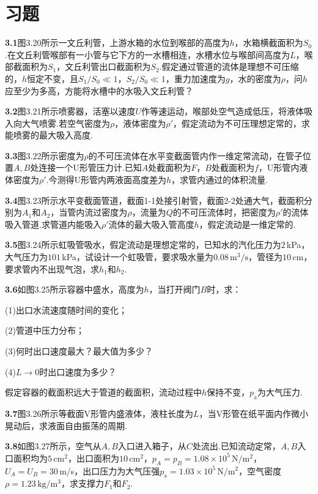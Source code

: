 \section*{习题}

\noindent\textbf{3.1}\quad 图3.20所示一文丘利管，上游水箱的水位到喉部的高度为$h$，水箱横截面积为$S_0$.在文丘利管喉部有一小管与它下方的一水槽相连，水槽水位与喉部间高度为$L$，喉部截面积为$S_1$，文丘利管出口截面积为$S_2$.假定通过管道的流体是理想不可压缩的，$h$恒定不变，且$S_1/S_0\ll 1$，$S_2/S_0\ll 1$，重力加速度为$g$，水的密度为$\rho$，问$h$应至少为多高，方能将水槽中的水吸入文丘利管？

\medskip
\noindent\textbf{3.2}\quad 图3.21所示喷雾器，活塞以速度$U$作等速运动，喉部处空气造成低压，将液体吸入向大气喷雾.若空气密度为$\rho$，液体密度为$\rho'$，假定流动为不可压理想定常的，求能喷雾的最大吸入高度.

\medskip
\noindent\textbf{3.3}\quad 图3.22所示密度为$\rho$的不可压流体在水平变截面管内作一维定常流动，在管子位置$A,B$处连接一个U形管压力计.已知$A$处截面积为$F$，$B$处截面积为$f$，U形管内液体密度为$\rho'$.今测得U形管内两液面高度差为$h$，求管内通过的体积流量.

\medskip
\noindent\textbf{3.4}\quad 图3.23所示水平变截面管道，截面1-1处接引射管，截面2-2处通大气，截面积分别为$A_1$和$A_2$，当管内流过密度为$\rho$，流量为$Q$的不可压流体时，把密度为$\rho'$的流体吸入管道.求管道内能吸入$\rho'$流体的最大吸入管高度$h$，假定流动是一维定常的.

\medskip
\noindent\textbf{3.5}\quad 图3.24所示虹吸管吸水，假定流动是理想定常的，已知水的汽化压力为$2\,$kPa，大气压力为$101\,$kPa，试设计一个虹吸管，要求吸水量为$0.08\,\mathrm{m^3/s}$，管径为$10\,$cm，要求管内不出现气泡，求$h_1$和$h_2$.

\medskip
\noindent\textbf{3.6}\quad 如图3.25所示容器中盛水，高度为$h$，当打开阀门$B$时，求：

(1)出口水流速度随时间的变化；

(2)管道中压力分布；

(3)何时出口速度最大？最大值为多少？

(4)$L\to 0$时出口速度为多少？

假定容器的截面积远大于管道的截面积，流动过程中$h$保持不变，$p_{\mathrm{a}}$为大气压力.

\medskip
\noindent\textbf{3.7}\quad 图3.26所示等截面V形管内盛液体，液柱长度为$L$，当V形管在纸平面内作微小晃动后，求液面自由振荡的周期.

\medskip
\noindent\textbf{3.8}\quad 如图3.27所示，空气从$A,B$入口进入箱子，从$C$处流出.已知流动定常，$A,B$入口面积均为$5\,\mathrm{cm^2}$，出口面积为$10\,\mathrm{cm^2}$，$p_A=p_B=1.08\times 10^{5}\,\mathrm{N/m^2}$，$U_A=U_B=30\,$m/s，出口压力为大气压强$p_{\mathrm{a}}=1.03\times 10^{5}\,\mathrm{N/m^2}$，空气密度$\rho=1.23\,\mathrm{kg/m^3}$，求支撑力$F_1$和$F_2$.

